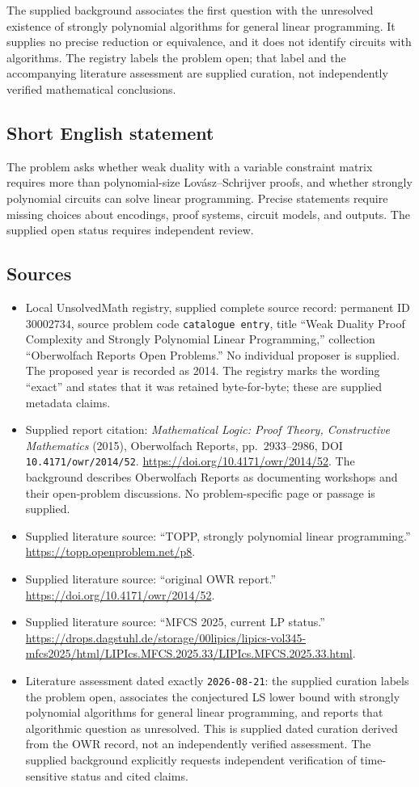 \documentclass[11pt]{article}
\begin{document}
The supplied background associates the first question with the unresolved existence of strongly polynomial algorithms for general linear programming. It supplies no precise reduction or equivalence, and it does not identify circuits with algorithms. The registry labels the problem open; that label and the accompanying literature assessment are supplied curation, not independently verified mathematical conclusions.
\subsection{Short English statement}
The problem asks whether weak duality with a variable constraint matrix requires more than polynomial-size Lov\'asz--Schrijver proofs, and whether strongly polynomial circuits can solve linear programming. Precise statements require missing choices about encodings, proof systems, circuit models, and outputs. The supplied open status requires independent review.
\subsection{Sources}
\begin{itemize}
\item Local UnsolvedMath registry, supplied complete source record: permanent ID \(30002734\), source problem code \texttt{catalogue entry}, title ``Weak Duality Proof Complexity and Strongly Polynomial Linear Programming,'' collection ``Oberwolfach Reports Open Problems.'' No individual proposer is supplied. The proposed year is recorded as 2014. The registry marks the wording ``exact'' and states that it was retained byte-for-byte; these are supplied metadata claims.
\item Supplied report citation: \emph{Mathematical Logic: Proof Theory, Constructive Mathematics} (2015), Oberwolfach Reports, pp.~2933--2986, DOI \texttt{10.4171/owr/2014/52}. \url{https://doi.org/10.4171/owr/2014/52}. The background describes Oberwolfach Reports as documenting workshops and their open-problem discussions. No problem-specific page or passage is supplied.
\item Supplied literature source: ``TOPP, strongly polynomial linear programming.'' \url{https://topp.openproblem.net/p8}.
\item Supplied literature source: ``original OWR report.'' \url{https://doi.org/10.4171/owr/2014/52}.
\item Supplied literature source: ``MFCS 2025, current LP status.'' \url{https://drops.dagstuhl.de/storage/00lipics/lipics-vol345-mfcs2025/html/LIPIcs.MFCS.2025.33/LIPIcs.MFCS.2025.33.html}.
\item Literature assessment dated exactly \texttt{2026-08-21}: the supplied curation labels the problem open, associates the conjectured LS lower bound with strongly polynomial algorithms for general linear programming, and reports that algorithmic question as unresolved. This is supplied dated curation derived from the OWR record, not an independently verified assessment. The supplied background explicitly requests independent verification of time-sensitive status and cited claims.
\end{itemize}
\end{document}
